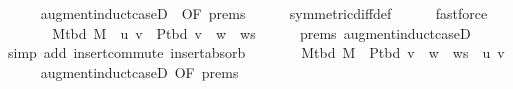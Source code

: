 \begin{isabellebody}
\ \ \ \ \isamarkupfalse%
\ augment{\isacharunderscore}{\kern0pt}induct{\isacharunderscore}{\kern0pt}case{\isacharunderscore}{\kern0pt}{}D{\isacharparenleft}{\kern0pt}{}{\isacharcomma}{\kern0pt}\ {}{\isacharcomma}{\kern0pt}\ {}{\isacharparenright}{\kern0pt}{\isacharbrackleft}{\kern0pt}OF\ {\isachardoublequoteopen}{}{\isachardot}{\kern0pt}prems{\isachardoublequoteclose}{\isacharbrackright}{\kern0pt}\isanewline
\ \ \ \ \isamarkupfalse%
\ symmetric{\isacharunderscore}{\kern0pt}diff{\isacharunderscore}{\kern0pt}def\isanewline
\ \ \ \ \isamarkupfalse%
\ fastforce\isanewline
\ \ \isamarkupfalse%
\ \isamarkupfalse%
\ {\isachardoublequoteopen}{\isachardot}{\kern0pt}{\isachardot}{\kern0pt}{\isachardot}{\kern0pt}\ {\isacharequal}{\kern0pt}\ M{\isacharunderscore}{\kern0pt}tbd\ M\ {\isasymunion}\ {\isacharbraceleft}{\kern0pt}{\isacharbraceleft}{\kern0pt}u{\isacharcomma}{\kern0pt}\ v{\isacharbraceright}{\kern0pt}{\isacharbraceright}{\kern0pt}\ {\isasymoplus}\ P{\isacharunderscore}{\kern0pt}tbd\ {\isacharparenleft}{\kern0pt}v\ {\isacharhash}{\kern0pt}\ w\ {\isacharhash}{\kern0pt}\ ws{\isacharparenright}{\kern0pt}{\isachardoublequoteclose}\isanewline
\ \ \ \ \isamarkupfalse%
\ {\isachardoublequoteopen}{}{\isachardot}{\kern0pt}prems{\isachardoublequoteclose}\ augment{\isacharunderscore}{\kern0pt}induct{\isacharunderscore}{\kern0pt}case{\isacharunderscore}{\kern0pt}{}D{\isacharparenleft}{\kern0pt}{}{\isacharparenright}{\kern0pt}\isanewline
\ \ \ \ \isamarkupfalse%
\ {\isacharparenleft}{\kern0pt}simp\ add{\isacharcolon}{\kern0pt}\ insert{\isacharunderscore}{\kern0pt}commute\ insert{\isacharunderscore}{\kern0pt}absorb{\isacharparenright}{\kern0pt}\isanewline
\ \ \isamarkupfalse%
\ \isamarkupfalse%
\ {\isachardoublequoteopen}{\isachardot}{\kern0pt}{\isachardot}{\kern0pt}{\isachardot}{\kern0pt}\ {\isacharequal}{\kern0pt}\ M{\isacharunderscore}{\kern0pt}tbd\ M\ {\isasymoplus}\ {\isacharparenleft}{\kern0pt}P{\isacharunderscore}{\kern0pt}tbd\ {\isacharparenleft}{\kern0pt}v\ {\isacharhash}{\kern0pt}\ w\ {\isacharhash}{\kern0pt}\ ws{\isacharparenright}{\kern0pt}\ {\isasymunion}\ {\isacharbraceleft}{\kern0pt}{\isacharbraceleft}{\kern0pt}u{\isacharcomma}{\kern0pt}\ v{\isacharbraceright}{\kern0pt}{\isacharbraceright}{\kern0pt}{\isacharparenright}{\kern0pt}{\isachardoublequoteclose}\isanewline
\ \ \ \ \isamarkupfalse%
\ augment{\isacharunderscore}{\kern0pt}induct{\isacharunderscore}{\kern0pt}case{\isacharunderscore}{\kern0pt}{}D{\isacharparenleft}{\kern0pt}{}{\isacharcomma}{\kern0pt}\ {}{\isacharparenright}{\kern0pt}{\isacharbrackleft}{\kern0pt}OF\ {\isachardoublequoteopen}{}{\isachardot}{\kern0pt}prems{\isachardoublequoteclose}{\isacharbrackright}{\kern0pt}\isanewline

\end{isabellebody}
